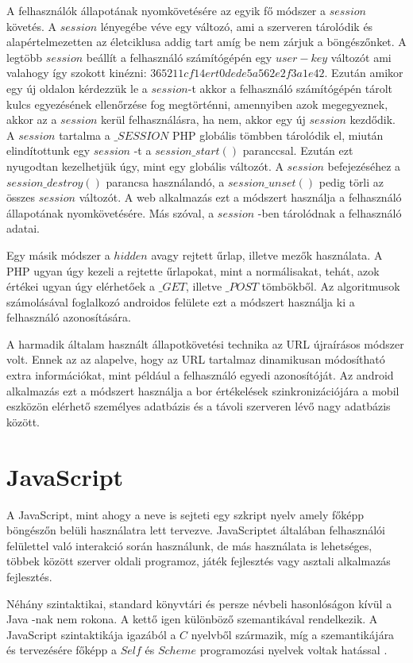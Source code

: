 \documentclass[12pt]{report}
\theoremstyle{definition}
\begin{document}
	A felhasználók állapotának nyomkövetésére az egyik fő módszer a $session$ követés. A $session$ lényegébe véve egy változó, ami a szerveren tárolódik és alapértelmezetten az életciklusa addig tart amíg be nem zárjuk a böngészőnket. A legtöbb $session$ beállít a felhasználó számítógépén egy $user-key$ változót ami valahogy így szokott kinézni: $365211cf14ert0dede5a562e2f3a1e42$. Ezután amikor egy új oldalon kérdezzük le a $session$-t akkor a felhasználó számítógépén tárolt kulcs egyezésének ellenőrzése fog megtörténni, amennyiben azok megegyeznek, akkor az a $session$ kerül felhasználásra, ha nem, akkor egy új $session$ kezdődik.
	A $session$ tartalma a $\_SESSION$ PHP globális tömbben tárolódik el, miután elindítottunk egy $session$ -t a $session\_start\left(\right)$ paranccsal. Ezután ezt nyugodtan kezelhetjük úgy, mint egy globális változót. A $session$ befejezéséhez a $session\_destroy\left(\right)$ parancsa használandó, a $session\_unset\left(\right)$ pedig törli az összes $session$ változót. A web alkalmazás ezt a módszert használja a felhasználó állapotának nyomkövetésére. Más szóval, a $session$ -ben tárolódnak a felhasználó adatai.
	
	Egy másik módszer a $hidden$ avagy rejtett űrlap, illetve mezők használata. A PHP ugyan úgy kezeli a rejtette űrlapokat, mint a normálisakat, tehát, azok értékei ugyan úgy elérhetőek a $\_GET$, illetve $\_POST$ tömbökből. Az algoritmusok számolásával foglalkozó androidos felülete ezt a módszert használja ki a felhasználó azonosítására.
	
	A harmadik általam használt állapotkövetési technika az URL újraírásos módszer volt. Ennek az az alapelve, hogy az URL tartalmaz dinamikusan módosítható extra információkat, mint például a felhasználó egyedi azonosítóját. Az android alkalmazás ezt a módszert használja a bor értékelések szinkronizációjára a mobil eszközön elérhető személyes adatbázis és a távoli szerveren lévő nagy adatbázis között.
	
	
	\section{JavaScript}
	A JavaScript, mint ahogy a neve is sejteti egy szkript nyelv amely főképp böngészőn belüli használatra lett tervezve. JavaScriptet általában felhasználói felülettel való interakció során használunk, de más használata is lehetséges, többek között szerver oldali programoz, játék fejlesztés vagy asztali alkalmazás fejlesztés.
	
	Néhány szintaktikai, standard könyvtári és persze névbeli hasonlóságon kívül a Java -nak nem rokona. A kettő igen különböző szemantikával rendelkezik. A JavaScript szintaktikája igazából a $C$ nyelvből származik, míg a szemantikájára és tervezésére főképp a $Self$ és $Scheme$ programozási nyelvek voltak hatással \cite{ECMAScript Language Overview}.
	
\end{document}

